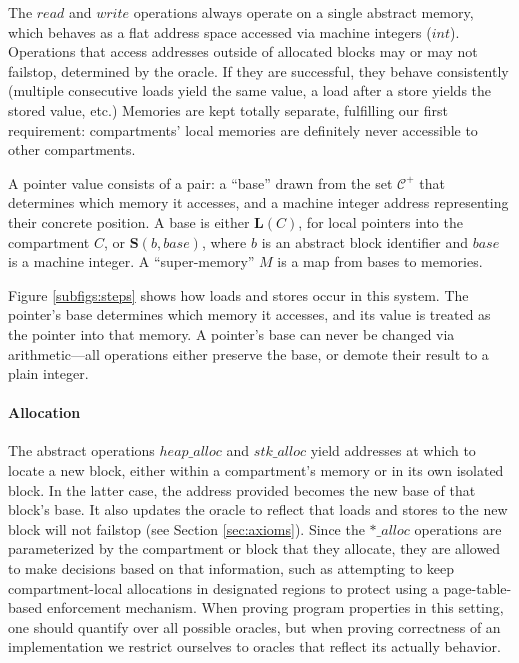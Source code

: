 \documentclass{article}
\begin{document}
The \(\mathit{read}\) and \(\mathit{write}\) operations always operate on a single
abstract memory, which behaves as a flat address space accessed via machine integers
(\(\mathit{int}\)). Operations that access addresses outside of allocated blocks
may or may not failstop, determined by the oracle. If they are successful, they
behave consistently (multiple consecutive loads yield the same value, a load after
a store yields the stored value, etc.) Memories are kept totally
separate, fulfilling our first requirement: compartments' local memories are
definitely never accessible to other compartments.

A pointer value consists of a pair: a ``base'' drawn from the set \(\mathcal{C}^+\)
that determines which memory it accesses, and a machine integer address representing
their concrete position. A base is either \(\mathbf{L}(C)\), for local pointers into
the compartment \(C\), or \(\mathbf{S}(b,\mathit{base})\), where \(b\) is an
abstract block identifier and \(\mathit{base}\) is a machine integer. A
``super-memory'' \(M\) is a map from bases to memories.

Figure \ref{subfigs:steps} shows how loads and stores occur in this system.
The pointer's base determines which memory it accesses, and its value is treated
as the pointer into that memory. A pointer's base can never be changed via
arithmetic---all operations either preserve the base, or demote their result
to a plain integer.

\paragraph{Allocation}

The abstract operations \(\mathit{heap\_alloc}\) and \(\mathit{stk\_alloc}\)
yield addresses at which to locate a new block, either within a compartment's memory
or in its own isolated block. In the latter case, the address provided becomes
the new base of that block's base. It also updates the oracle to reflect that loads
and stores to the new block will not failstop (see Section \ref{sec:axioms}). Since
the \(\mathit{*\_alloc}\) operations are parameterized by the compartment
or block that they allocate, they are allowed to make decisions based on that
information, such as attempting to keep compartment-local allocations in designated
regions to protect using a page-table-based enforcement mechanism. When proving
program properties in this setting, one should quantify over all possible oracles,
but when proving correctness of an implementation we restrict ourselves to oracles
that reflect its actually behavior.
\end{document}
